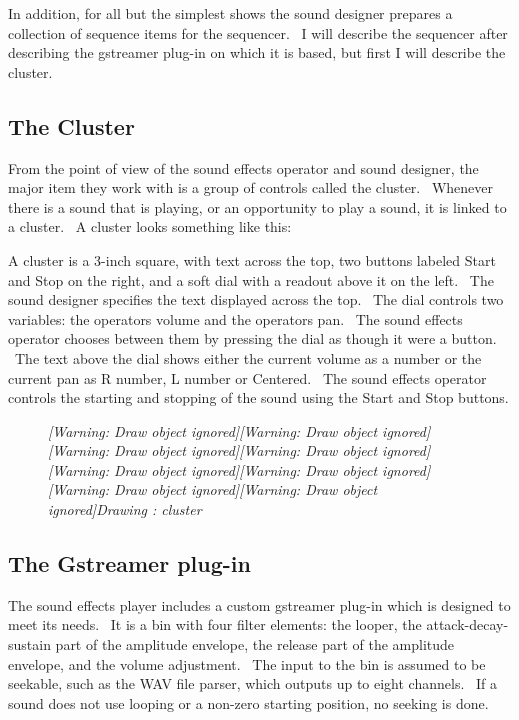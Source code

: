 \documentclass[letterpaper]{article}
\newcounter{Drawing}
\renewcommand\theDrawing{\arabic{Drawing}}
\begin{document}
In addition, for all but the simplest shows the sound designer prepares
a collection of sequence items for the sequencer. \ I will describe the
sequencer after describing the gstreamer plug-in on which it is based,
but first I will describe the cluster.

\subsection{The Cluster}
From the point of view of the sound effects operator and sound designer,
the major item they work with is a group of controls called the
cluster. \ Whenever there is a sound that is playing, or an opportunity
to play a sound, it is linked to a cluster. \ A cluster looks something
like this:

A cluster is a 3-inch square, with text across the top, two buttons
labeled Start and Stop on the right, and a soft dial with a readout
above it on the left. \ The sound designer specifies the text displayed
across the top. \ The dial controls two variables: the
operator{\textquotesingle}s volume and the operator{\textquotesingle}s
pan. \ The sound effects operator chooses between them by pressing the
dial as though it were a button. \ The text above the dial shows either
the current volume as a number or the current pan as R number, L number
or Centered. \ The sound effects operator controls the starting and
stopping of the sound using the Start and Stop buttons.

\begin{figure}
\centering
\begin{minipage}{7in}
{\centering\itshape
[Warning: Draw object ignored][Warning: Draw object ignored][Warning:
Draw object ignored][Warning: Draw object ignored][Warning: Draw object
ignored][Warning: Draw object ignored][Warning: Draw object
ignored][Warning: Draw object ignored]Drawing
\stepcounter{Drawing}{\theDrawing}: cluster
\par}
\end{minipage}
\end{figure}
\subsection{The Gstreamer plug-in}
The sound effects player includes a custom gstreamer plug-in which is
designed to meet its needs. \ It is a bin with four filter elements:
the looper, the attack-decay-sustain part of the amplitude envelope,
the release part of the amplitude envelope, and the volume adjustment.
\ The input to the bin is assumed to be seekable, such as the WAV file
parser, which outputs up to eight channels. \ If a sound does not use
looping or a non-zero starting position, no seeking is done.
\end{document}
